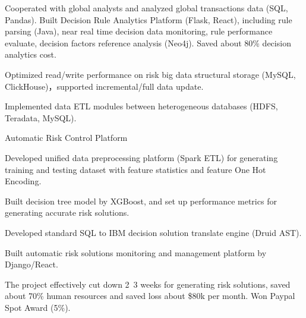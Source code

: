 \documentclass[11pt, a4paper, UTF8]{awesome-cv}
\begin{document}
\begin{cventries}
{\begin{cvitems}
        \item {Cooperated with global analysts and analyzed global transactions data (SQL, Pandas). Built Decision Rule Analytics Platform (Flask, React), including rule parsing (Java), near real time decision data monitoring, rule performance  evaluate, decision factors reference analysis (Neo4j). Saved about 80\% decision analytics cost.}
        \item {Optimized read/write performance on risk big data structural storage (MySQL, ClickHouse)，supported incremental/full data update.}
        \item {Implemented data ETL modules between heterogeneous databases (HDFS, Teradata, MySQL).}
      \end{cvitems}
    }
    
  \cventry
    {Automatic Risk Control Platform} %
    {} %
    {} %
    {\ } %
    {
      \begin{cvitems} %
        \item {Developed unified data preprocessing platform (Spark ETL) for generating training and testing dataset with feature statistics and feature One Hot Encoding.}
        \item {Built decision tree model by XGBoost, and set up performance metrics for generating accurate risk solutions.}
        \item {Developed standard SQL to IBM decision solution translate engine (Druid AST).}
        \item {Built automatic risk solutions monitoring and management platform by Django/React.}
        \item {The project effectively cut down 2~3 weeks for generating risk solutions, saved about 70\% human resources and saved loss about \$80k per month. Won Paypal Spot Award (5\%).}
      \end{cvitems}
    }


\end{cventries}
\end{document}
